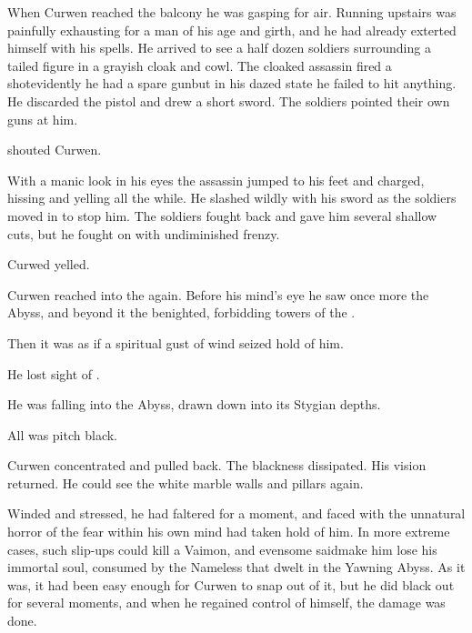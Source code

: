 
When Curwen reached the balcony he was gasping for air. 
Running upstairs was painfully exhausting for a man of his age and girth, and he had already exterted himself with his spells. 
He arrived to see a half dozen soldiers surrounding a tailed figure in a grayish cloak and cowl.
The cloaked assassin fired a shot\dash evidently he had a spare gun\dash but in his dazed state he failed to hit anything. 
He discarded the pistol and drew a short sword. 
The soldiers pointed their own guns at him. 

 shouted Curwen. 

With a manic look in his eyes the assassin jumped to his feet and charged, hissing and yelling all the while. 
He slashed wildly with his sword as the soldiers moved in to stop him. 
The soldiers fought back and gave him several shallow cuts, but he fought on with undiminished frenzy. 

 Curwed yelled. 


Curwen reached into the \empyrean again. 
Before his mind's eye he saw once more the Abyss, and beyond it the benighted, forbidding towers of the \qliphoth. 

Then it was as if a spiritual gust of wind seized hold of him. 

He lost sight of \itzach. 

He was falling into the Abyss, drawn down into its Stygian depths. 

All was pitch black. 


Curwen concentrated and pulled back. 
The blackness dissipated. 
His vision returned. 
He could see the white marble walls and pillars again. 

Winded and stressed, he had faltered for a moment, and faced with the unnatural horror of \itzach the fear within his own mind had taken hold of him. 
In more extreme cases, such slip-ups could kill a Vaimon, and even\dash some said\dash make him lose his immortal soul, consumed by the Nameless \Qliphoth that dwelt in the Yawning Abyss. 
As it was, it had been easy enough for Curwen to snap out of it, but he did black out for several moments, and when he regained control of himself, the damage was done. 

